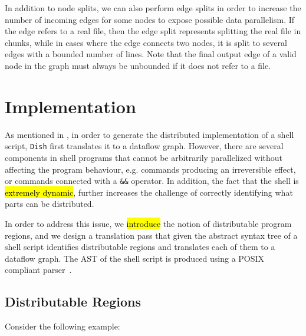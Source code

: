 \documentclass[sigplan,10pt,review,anonymous]{acmart}
\newcommand{\ttt}[1]{\texttt{\small #1}}
\newcommand{\todo}[1]{\hl{#1}\xspace}
\newcommand{\kk}[1]{[{\color{magenta}#1 --- kk}]}
\begin{document}

In addition to node splits, we can also perform edge splits in order
to increase the number of incoming edges for some nodes to expose
possible data parallelism. If the edge refers to a real file, then the
edge split represents splitting the real file in chunks, while in
cases where the edge connects two nodes, it is split to several edges
with a bounded number of lines. Note that the final output edge of a
valid node in the graph must always be unbounded if it does not refer
to a file.





\section{Implementation}
\label{impl}

As mentioned in , in order to generate the distributed
implementation of a shell script, \ttt{Dish} first translates it to
a dataflow graph. However, there are several components in shell
programs that cannot be arbitrarily parallelized without affecting the
program behaviour, e.g. commands producing an irreversible effect, or
commands connected with a \ttt{\&\&} operator. In addition, the
fact that the shell is \todo{extremely dynamic}, further increases the
challenge of correctly identifying what parts can be distributed.


In order to address this issue, we \todo{introduce} the notion of
distributable program regions, and we design a translation pass that
given the abstract syntax tree of a shell script identifies
distributable regions and translates each of them to a dataflow
graph. The AST of the shell script is produced using a POSIX compliant
parser~\cite{libdash}.

\subsection{Distributable Regions}


Consider the following example:
\end{document}
